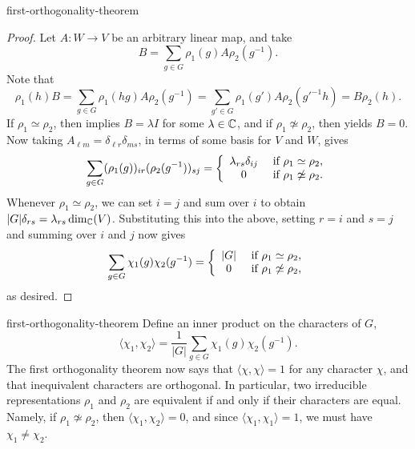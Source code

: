\begin{example}{first-orthogonality-theorem}
    \begin{proof}
        Let $A : W \to V$ be an arbitrary linear map, and take
        \[ B = \sum_{g \in G} \rho_1(g) A \rho_2(g^{-1}) . \]
        Note that
        \[ \rho_1(h) B = \sum_{g \in G} \rho_1(hg) A \rho_2(g^{-1}) = \sum_{g' \in G} \rho_1(g') A \rho_2(g'^{-1} h) = B \rho_2(h) . \]
        If $\rho_1 \simeq \rho_2$, then  implies $B = \lambda I$ for some $\lambda \in \mathbb{C}$, and if $\rho_1 \not\simeq \rho_2$, then  yields $B = 0$. Now taking $A_{\ell m} = \delta_{\ell r} \delta_{ms}$, in terms of some basis for $V$ and $W$, gives
        \[ \sum_{g \in G} (\rho_1(g))_{ir} (\rho_2(g^{-1}))_{sj} = \left\{ \begin{array}{cl} \lambda_{rs} \delta_{ij} & \textup{ if } \rho_1 \simeq \rho_2 , \\ 0 & \textup{ if } \rho_1 \not\simeq \rho_2 . \end{array} \right. \]
        Whenever $\rho_1 \simeq \rho_2$, we can set $i = j$ and sum over $i$ to obtain $|G| \delta_{rs} = \lambda_{rs} \dim_{\mathbb{C}}(V)$. Substituting this into the above, setting $r = i$ and $s = j$ and summing over $i$ and $j$ now gives
        \[ \sum_{g \in G} \chi_1(g) \chi_2(g^{-1}) = \left\{ \begin{array}{cl} |G| & \textup{ if } \rho_1 \simeq \rho_2 , \\ 0 & \textup{ if } \rho_1 \not\simeq \rho_2 , \end{array} \right. \]
        as desired.
    \end{proof}
\end{example}

\begin{example}{first-orthogonality-theorem}
    Define an inner product on the characters of $G$,
    \[ \langle \chi_1, \chi_2 \rangle = \frac{1}{|G|} \sum_{g \in G} \chi_1(g) \chi_2(g^{-1}) . \]
    The first orthogonality theorem now says that $\langle \chi, \chi \rangle = 1$ for any character $\chi$, and that inequivalent characters are orthogonal. In particular, two irreducible representations $\rho_1$ and $\rho_2$ are equivalent if and only if their characters are equal. Namely, if $\rho_1 \not\simeq \rho_2$, then $\langle \chi_1, \chi_2 \rangle = 0$, and since $\langle \chi_1, \chi_1 \rangle = 1$, we must have $\chi_1 \ne \chi_2$.
\end{example}

